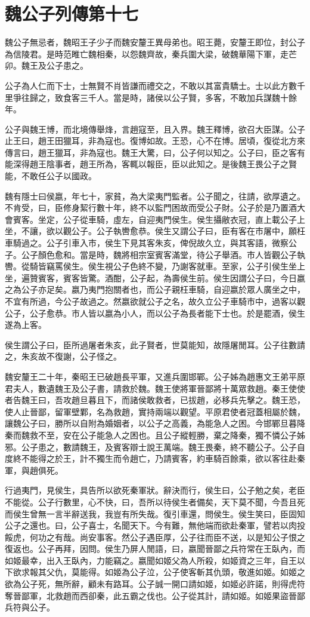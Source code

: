 \chapter{魏公子列傳第十七}

魏公子無忌者，魏昭王子少子而魏安釐王異母弟也。昭王薨，安釐王即位，封公子為信陵君。是時范睢亡魏相秦，以怨魏齊故，秦兵圍大梁，破魏華陽下軍，走芒卯。魏王及公子患之。

公子為人仁而下士，士無賢不肖皆謙而禮交之，不敢以其富貴驕士。士以此方數千里爭往歸之，致食客三千人。當是時，諸侯以公子賢，多客，不敢加兵謀魏十餘年。

公子與魏王博，而北境傳舉烽，言趙寇至，且入界。魏王釋博，欲召大臣謀。公子止王曰，趙王田獵耳，非為寇也。復博如故。王恐，心不在博。居頃，復從北方來傳言曰，趙王獵耳，非為寇也。魏王大驚，曰，公子何以知之。公子曰，臣之客有能深得趙王陰事者，趙王所為，客輒以報臣，臣以此知之。是後魏王畏公子之賢能，不敢任公子以國政。

魏有隱士曰侯嬴，年七十，家貧，為大梁夷門監者。公子聞之，往請，欲厚遺之。不肯受，曰，臣修身絜行數十年，終不以監門困故而受公子財。公子於是乃置酒大會賓客。坐定，公子從車騎，虛左，自迎夷門侯生。侯生攝敝衣冠，直上載公子上坐，不讓，欲以觀公子。公子執轡愈恭。侯生又謂公子曰，臣有客在市屠中，願枉車騎過之。公子引車入市，侯生下見其客朱亥，俾倪故久立，與其客語，微察公子。公子顏色愈和。當是時，魏將相宗室賓客滿堂，待公子舉酒。市人皆觀公子執轡。從騎皆竊罵侯生。侯生視公子色終不變，乃謝客就車。至家，公子引侯生坐上坐，遍贊賓客，賓客皆驚。酒酣，公子起，為壽侯生前。侯生因謂公子曰，今日嬴之為公子亦足矣。嬴乃夷門抱關者也，而公子親枉車騎，自迎嬴於眾人廣坐之中，不宜有所過，今公子故過之。然嬴欲就公子之名，故久立公子車騎市中，過客以觀公子，公子愈恭。市人皆以嬴為小人，而以公子為長者能下士也。於是罷酒，侯生遂為上客。

侯生謂公子曰，臣所過屠者朱亥，此子賢者，世莫能知，故隱屠閒耳。公子往數請之，朱亥故不復謝，公子怪之。

魏安釐王二十年，秦昭王已破趙長平軍，又進兵圍邯鄲。公子姊為趙惠文王弟平原君夫人，數遺魏王及公子書，請救於魏。魏王使將軍晉鄙將十萬眾救趙。秦王使使者告魏王曰，吾攻趙旦暮且下，而諸侯敢救者，已拔趙，必移兵先擊之。魏王恐，使人止晉鄙，留軍壁鄴，名為救趙，實持兩端以觀望。平原君使者冠蓋相屬於魏，讓魏公子曰，勝所以自附為婚姻者，以公子之高義，為能急人之困。今邯鄲旦暮降秦而魏救不至，安在公子能急人之困也。且公子縱輕勝，棄之降秦，獨不憐公子姊邪。公子患之，數請魏王，及賓客辯士說王萬端。魏王畏秦，終不聽公子。公子自度終不能得之於王，計不獨生而令趙亡，乃請賓客，約車騎百餘乘，欲以客往赴秦軍，與趙俱死。

行過夷門，見侯生，具告所以欲死秦軍狀。辭決而行，侯生曰，公子勉之矣，老臣不能從。公子行數里，心不快，曰，吾所以待侯生者備矣，天下莫不聞，今吾且死而侯生曾無一言半辭送我，我豈有所失哉。復引車還，問侯生。侯生笑曰，臣固知公子之還也。曰，公子喜士，名聞天下。今有難，無他端而欲赴秦軍，譬若以肉投餒虎，何功之有哉。尚安事客。然公子遇臣厚，公子往而臣不送，以是知公子恨之復返也。公子再拜，因問。侯生乃屏人閒語，曰，嬴聞晉鄙之兵符常在王臥內，而如姬最幸，出入王臥內，力能竊之。嬴聞如姬父為人所殺，如姬資之三年，自王以下欲求報其父仇，莫能得。如姬為公子泣，公子使客斬其仇頭，敬進如姬。如姬之欲為公子死，無所辭，顧未有路耳。公子誠一開口請如姬，如姬必許諾，則得虎符奪晉鄙軍，北救趙而西卻秦，此五霸之伐也。公子從其計，請如姬。如姬果盜晉鄙兵符與公子。

